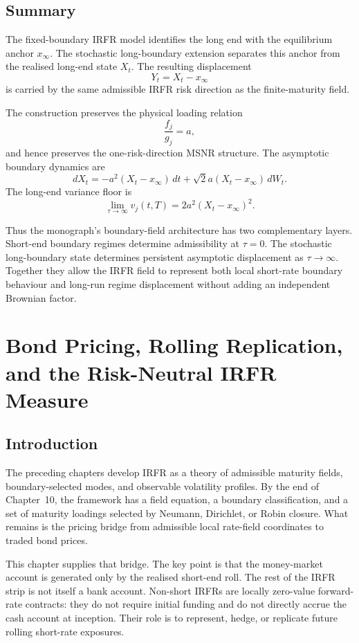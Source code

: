 \documentclass[11pt,oneside]{book}
\begin{document}
\section{Summary}

The fixed-boundary IRFR model identifies the long end with the equilibrium anchor \(x_\infty\). The stochastic long-boundary extension separates this anchor from the realised long-end state \(X_t\). The resulting displacement
\[
Y_t=X_t-x_\infty
\]
is carried by the same admissible IRFR risk direction as the finite-maturity field.

The construction preserves the physical loading relation
\[
\frac{f_j}{g_j}=a,
\]
and hence preserves the one-risk-direction MSNR structure. The asymptotic boundary dynamics are
\[
dX_t
=
-a^2(X_t-x_\infty)\,dt
+
\sqrt{2}a(X_t-x_\infty)\,dW_t.
\]
The long-end variance floor is
\[
\lim_{\tau\to\infty}v_j(t,T)
=
2a^2(X_t-x_\infty)^2.
\]

Thus the monograph's boundary-field architecture has two complementary layers. Short-end boundary regimes determine admissibility at \(\tau=0\). The stochastic long-boundary state determines persistent asymptotic displacement as \(\tau\to\infty\). Together they allow the IRFR field to represent both local short-rate boundary behaviour and long-run regime displacement without adding an independent Brownian factor.


\chapter[Bond Pricing and the Risk-Neutral IRFR Measure]{Bond Pricing, Rolling Replication, and the Risk-Neutral IRFR Measure}
\label{ch:risk-neutral-irfr}

\section{Introduction}
\label{introduction-risk-neutral-irfr}

The preceding chapters develop IRFR as a theory of admissible maturity
fields, boundary-selected modes, and observable volatility profiles. By
the end of Chapter~10, the framework has a field equation, a boundary
classification, and a set of maturity loadings selected by Neumann,
Dirichlet, or Robin closure. What remains is the pricing bridge from
admissible local rate-field coordinates to traded bond prices.

This chapter supplies that bridge. The key point is that the money-market
account is generated only by the realised short-end roll. The rest of the
IRFR strip is not itself a bank account. Non-short IRFRs are locally
zero-value forward-rate contracts: they do not require initial funding and
do not directly accrue the cash account at inception. Their role is to
represent, hedge, or replicate future rolling short-rate exposures.
\end{document}
